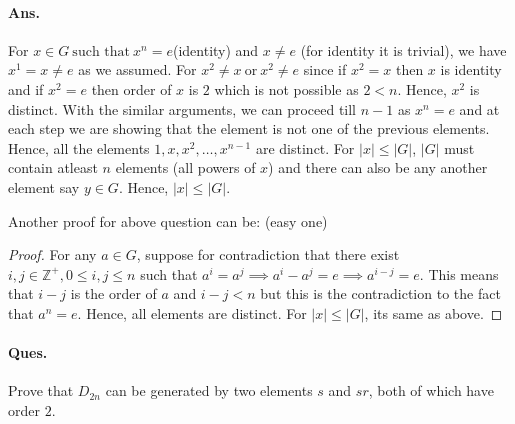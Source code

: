 \documentclass[12pt]{report}
\begin{document}
\paragraph*{Ans. }For $x \in G~\text{such that}~x^n = e$(identity) and $x \neq e$ (for identity it is trivial), we have $x^1 = x \neq e$ as we assumed. For $ x^2 \neq x~\text{or}~x^2 \neq e$ since if $x^2 = x$ then $x$ is identity and if $x^2 = e$ then order of $x$ is $2$ which is not possible as $2 < n$. Hence, $x^2$ is distinct. With the similar arguments, we can proceed till $n-1$ as $x^n = e$ and at each step we are showing that the element is not one of the previous elements. Hence, all the elements $1, x, x^2, \dots, x^{n-1}$ are distinct.
For $|x| \leq |G|$, $|G|$ must contain atleast $n$ elements (all powers of $x$) and there can also be any another element say $y \in G$. Hence, $|x| \leq |G|$.

Another proof for above question can be: (easy one)
\begin{proof}
    For any $a \in G$, suppose for contradiction that there exist $i,j\in \mathbb{Z^+}, 0 \leq i,j \leq n$ such that $a^i = a^j \implies a^i-a^j = e \implies a^{i-j} = e$. This means that $i-j$ is the order of $a$ and $i-j < n$ but this is the contradiction to the fact that $a^n = e$. Hence, all elements are distinct. For $|x| \leq |G|$, its same as above. 
\end{proof}
\paragraph*{Ques. } Prove that $D_{2n}$ can be generated by two elements $s$ and $sr$, both of which have order $2$.
\end{document}
